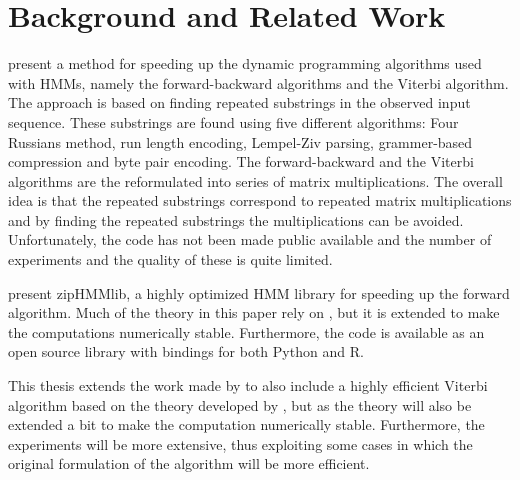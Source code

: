 \chapter{Background and Related Work}
\label{cha:backgr-relat-work}


\citet{lifshits2009speeding} present a method for speeding up the dynamic
programming algorithms used with HMMs, namely the forward-backward algorithms
and the Viterbi algorithm. The approach is based on finding repeated substrings
in the observed input sequence. These substrings are found using five different
algorithms: Four Russians method, run length encoding, Lempel-Ziv parsing,
grammer-based compression and byte pair encoding. The forward-backward and the
Viterbi algorithms are the reformulated into series of matrix
multiplications. The overall idea is that the repeated substrings correspond to
repeated matrix multiplications and by finding the repeated substrings the
multiplications can be avoided. Unfortunately, the code has not been made
public available and the number of experiments and the quality of these is
quite limited.

\citet{sand2013ziphmmlib} present zipHMMlib, a highly optimized HMM library for
speeding up the forward algorithm. Much of the theory in this paper rely on
\cite{lifshits2009speeding}, but it is extended to make the computations
numerically stable. Furthermore, the code is available as an open source
library with bindings for both Python and R.

This thesis extends the work made by \citet{sand2013ziphmmlib} to also include
a highly efficient Viterbi algorithm based on the theory developed by
\citet{lifshits2009speeding}, but as \citet{sand2013ziphmmlib} the theory will
also be extended a bit to make the computation numerically stable. Furthermore,
the experiments will be more extensive, thus exploiting some cases in which
the original formulation of the algorithm will be more efficient.

